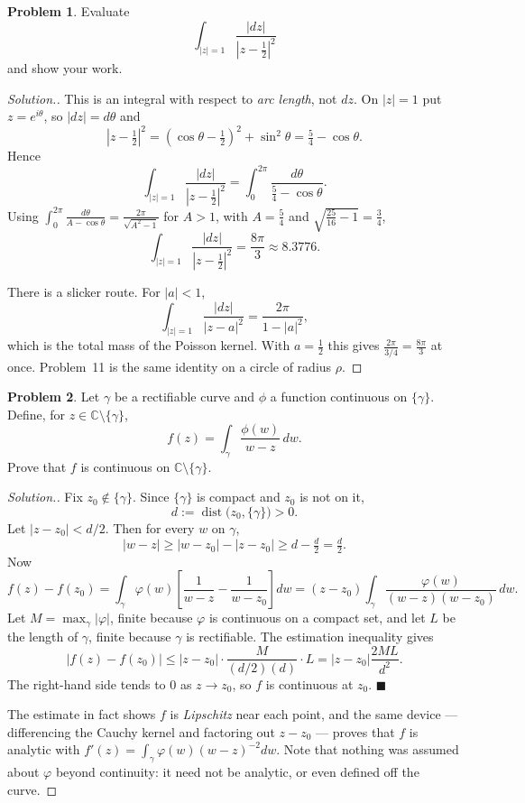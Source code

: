 \documentclass[11pt,a4paper]{article}
\theoremstyle{definition}
\newtheorem{problemx}{Problem}[section]
\newenvironment{problem}{\begin{problemx}}{\end{problemx}}
\newenvironment{solution}
  {\renewcommand{\qedsymbol}{}\begin{proof}[\textit{Solution}.]}
  {\end{proof}}
\begin{document}
\begin{problem}
Evaluate
$$\int_{\left|z\right| = 1}
\frac{\left|dz\right|}{\left|z - \tfrac{1}{2}\right|^{2}}$$
and show your work.
\end{problem}

\begin{solution}
This is an integral with respect to \emph{arc length}, not $dz$. On
$\left|z\right| = 1$ put $z = e^{i\theta}$, so $\left|dz\right| = d\theta$ and
$$\left|z - \tfrac12\right|^{2}
= \left(\cos\theta - \tfrac12\right)^{2} + \sin^{2}\theta
= \tfrac54 - \cos\theta .$$
Hence
$$\int_{\left|z\right|=1}\frac{\left|dz\right|}{\left|z-\frac12\right|^{2}}
= \int^{2\pi}_{0}\frac{d\theta}{\frac54 - \cos\theta}.$$
Using $\displaystyle\int^{2\pi}_{0}\frac{d\theta}{A - \cos\theta}
= \frac{2\pi}{\sqrt{A^{2}-1}}$ for $A > 1$, with $A = \frac54$ and
$\sqrt{\frac{25}{16}-1} = \frac34$,
$$\boxed{\int_{\left|z\right|=1}\frac{\left|dz\right|}{\left|z-\frac12\right|^{2}}
= \frac{8\pi}{3} \approx 8.3776 .}$$

There is a slicker route. For $\left|a\right| < 1$,
$$\int_{\left|z\right|=1}\frac{\left|dz\right|}{\left|z-a\right|^{2}}
= \frac{2\pi}{1 - \left|a\right|^{2}},$$
which is the total mass of the Poisson kernel. With $a = \frac12$ this gives
$\frac{2\pi}{3/4} = \frac{8\pi}{3}$ at once. Problem~11 is the same identity on a
circle of radius $\rho$.
\end{solution}


\begin{problem}
Let $\gamma$ be a rectifiable curve and $\phi$ a function continuous on
$\{\gamma\}$. Define, for $z \in \mathbb{C}\setminus\{\gamma\}$,
$$f(z) = \int_{\gamma}\frac{\phi(w)}{w - z}\,dw .$$
Prove that $f$ is continuous on $\mathbb{C}\setminus\{\gamma\}$.
\end{problem}

\begin{solution}
Fix $z_0 \notin \{\gamma\}$. Since $\{\gamma\}$ is compact and $z_0$ is not on it,
$$d := \operatorname{dist}\big(z_0, \{\gamma\}\big) > 0 .$$
Let $\left|z - z_0\right| < d/2$. Then for every $w$ on $\gamma$,
$$\left|w - z\right| \geq \left|w - z_0\right| - \left|z - z_0\right|
\geq d - \tfrac{d}{2} = \tfrac{d}{2}.$$
Now
$$f(z) - f(z_0)
= \int_{\gamma}\varphi(w)\left[\frac{1}{w-z} - \frac{1}{w-z_0}\right]dw
= \left(z - z_0\right)\int_{\gamma}\frac{\varphi(w)}{(w-z)(w-z_0)}\,dw .$$
Let $M = \max_{\gamma}\left|\varphi\right|$, finite because $\varphi$ is
continuous on a compact set, and let $L$ be the length of $\gamma$, finite because
$\gamma$ is rectifiable. The estimation inequality gives
$$\left|f(z) - f(z_0)\right|
\leq \left|z - z_0\right| \cdot \frac{M}{(d/2)(d)} \cdot L
= \left|z-z_0\right|\frac{2ML}{d^{2}} .$$
The right-hand side tends to $0$ as $z \rightarrow z_0$, so $f$ is continuous at
$z_0$. $\blacksquare$

The estimate in fact shows $f$ is \emph{Lipschitz} near each point, and the same
device --- differencing the Cauchy kernel and factoring out $z - z_0$ --- proves that
$f$ is analytic with $f'(z) = \int_\gamma \varphi(w)(w-z)^{-2}dw$. Note that
nothing was assumed about $\varphi$ beyond continuity: it need not be analytic,
or even defined off the curve.
\end{solution}
\end{document}
